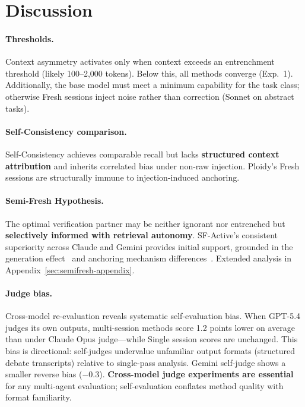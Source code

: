 \documentclass{article}
\begin{document}
\section{Discussion}
\label{sec:discussion}

\paragraph{Thresholds.} Context asymmetry activates only when context exceeds an entrenchment threshold (likely 100--2,000 tokens). Below this, all methods converge (Exp.~1). Additionally, the base model must meet a minimum capability for the task class; otherwise Fresh sessions inject noise rather than correction (Sonnet on abstract tasks).

\paragraph{Self-Consistency comparison.} Self-Consistency achieves comparable recall but lacks \textbf{structured context attribution} and inherits correlated bias under non-raw injection. Ploidy's Fresh sessions are structurally immune to injection-induced anchoring.

\paragraph{Semi-Fresh Hypothesis.} The optimal verification partner may be neither ignorant nor entrenched but \textbf{selectively informed with retrieval autonomy}. SF-Active's consistent superiority across Claude and Gemini provides initial support, grounded in the generation effect~\citep{slamecka1978generation} and anchoring mechanism differences~\citep{epley2006anchoring}. Extended analysis in Appendix~\ref{sec:semifresh-appendix}.

\paragraph{Judge bias.} Cross-model re-evaluation reveals systematic self-evaluation bias. When GPT-5.4 judges its own outputs, multi-session methods score 1.2 points lower on average than under Claude Opus judge---while Single session scores are unchanged. This bias is directional: self-judges undervalue unfamiliar output formats (structured debate transcripts) relative to single-pass analysis. Gemini self-judge shows a smaller reverse bias ($-$0.3). \textbf{Cross-model judge experiments are essential} for any multi-agent evaluation; self-evaluation conflates method quality with format familiarity.
\end{document}
